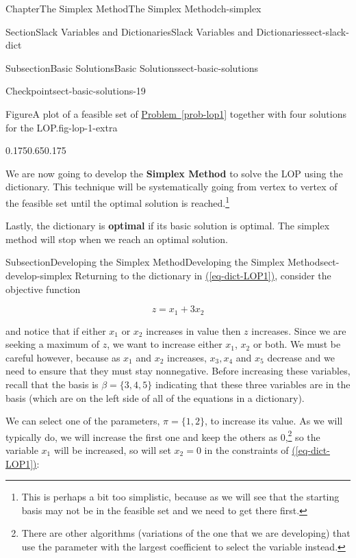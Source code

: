 \documentclass[oneside,10pt,]{book}
\newcommand{\xreffont}{\relax}
\newcommand{\terminology}[1]{\textbf{#1}}
\numberwithin{equation}{section}
\begin{document}
\begin{chapterptx}{Chapter}{The Simplex Method}{}{The Simplex Method}{}{}{ch-simplex}
\begin{sectionptx}{Section}{Slack Variables and Dictionaries}{}{Slack Variables and Dictionaries}{}{}{sect-slack-dict}
\begin{subsectionptx}{Subsection}{Basic Solutions}{}{Basic Solutions}{}{}{sect-basic-solutions}
\begin{inlineexercise}{Checkpoint}{}{sect-basic-solutions-19}
\begin{figureptx}{Figure}{A plot of a feasible set of \hyperref[prob-lop1]{Problem~{\xreffont\ref{prob-lop1}}} together with four solutions for the LOP.}{fig-lop-1-extra}{}
\begin{image}{0.175}{0.65}{0.175}{}
{}%
\end{image}%
\tcblower
\end{figureptx}%
\end{inlineexercise}%
We are now going to develop the \terminology{Simplex Method} to solve the LOP using the dictionary. This technique will be systematically going from vertex to vertex of the feasible set until the optimal solution is reached.\footnote{This is perhaps a bit too simplistic, because as we will see that the starting basis may not be in the feasible set and we need to get there first.\label{sect-basic-solutions-20-2}}%
\par
Lastly, the dictionary is \terminology{optimal} if its basic solution is optimal. The simplex method will stop when we reach an optimal solution.%
\end{subsectionptx}
%
%
\typeout{************************************************}
\typeout{************************************************}
%
\begin{subsectionptx}{Subsection}{Developing the Simplex Method}{}{Developing the Simplex Method}{}{}{sect-develop-simplex}
Returning to the dictionary in \hyperref[eq-dict-LOP1]{({\xreffont\ref{eq-dict-LOP1}})}, consider the objective function%
\par
%
\begin{equation*}
z = x_1 + 3x_2
\end{equation*}
%
\par
and notice that if either \(x_1\) or \(x_2\) increases in value then \(z\) increases. Since we are seeking a maximum of \(z\), we want to increase either \(x_1\), \(x_2\) or both. We must be careful however, because as \(x_1\) and \(x_2\) increases, \(x_3, x_4\) and \(x_5\) decrease and we need to ensure that they must stay nonnegative. Before increasing these variables, recall that the basis is \(\beta=\{3,4,5\}\) indicating that these three variables are in the basis (which are on the left side of all of the equations in a dictionary).%
\par
We can select one of the parameters, \(\pi=\{1,2\}\), to increase its value. As we will typically do, we will increase the first one and keep the others as 0,\footnote{There are other algorithms (variations of the one that we are developing) that use the parameter with the largest coefficient to select the variable instead.\label{sect-develop-simplex-5-2}} so the variable \(x_1\) will be increased, so will set \(x_2=0\) in the constraints of \hyperref[eq-dict-LOP1]{({\xreffont\ref{eq-dict-LOP1}})}:%

\end{subsectionptx}
\end{sectionptx}
\end{chapterptx}
\end{document}
